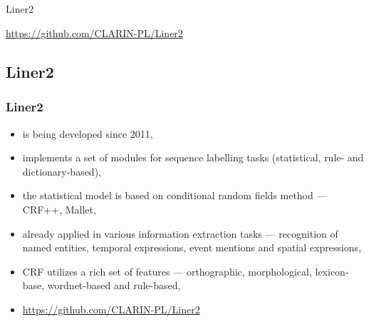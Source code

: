 \documentclass[Warsaw]{beamer}
\begin{document}
\subsection{}

\begin{frame}
    \begin{center}
        \Huge
        Liner2
        
        \normalsize
        \url{https://github.com/CLARIN-PL/Liner2}
    \end{center}
\end{frame}

\subsection{Liner2}

\begin{frame}
    \frametitle{Liner2}
    \begin{itemize}
        \item is being developed since 2011,
        \item implements a set of modules for sequence labelling tasks (statistical, rule- and dictionary-based),
        \item the statistical model is based on conditional random fields method --- CRF++, Mallet,
        \item already applied in various information extraction tasks --- recognition of named entities, temporal expressions, event mentions and spatial expressions, 
        \item CRF utilizes a rich set of features --- orthographic, morphological, lexicon-base, wordnet-based and rule-based,
        \item \url{https://github.com/CLARIN-PL/Liner2}
    \end{itemize}
\end{frame}
\end{document}
